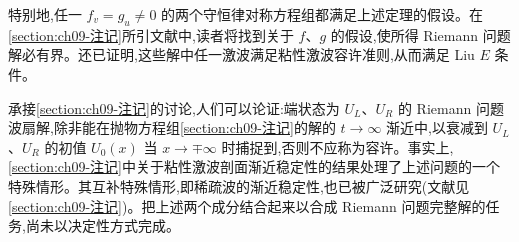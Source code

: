 \documentclass[../../main.tex]{subfiles}
\begin{document}
特别地,任一 $f_{v}=g_{u}\neq0$ 的两个守恒律对称方程组都满足上述定理的假设。在\cref{section:ch09-注记}所引文献中,读者将找到关于 $f$、$g$ 的假设,使所得 Riemann 问题解必有界。还已证明,这些解中任一激波满足粘性激波容许准则,从而满足 Liu $E$ 条件。

承接\cref{section:ch09-注记}的讨论,人们可以论证:端状态为 $U_{L}$、$U_{R}$ 的 Riemann 问题波扇解,除非能在抛物方程组\cref{section:ch09-注记}的解的 $t\to\infty$ 渐近中,以衰减到 $U_{L}$、$U_{R}$ 的初值 $U_{0}(x)$ 当 $x\to\mp\infty$ 时捕捉到,否则不应称为容许。事实上,\cref{section:ch09-注记}中关于粘性激波剖面渐近稳定性的结果处理了上述问题的一个特殊情形。其互补特殊情形,即稀疏波的渐近稳定性,也已被广泛研究(文献见\cref{section:ch09-注记})。把上述两个成分结合起来以合成 Riemann 问题完整解的任务,尚未以决定性方式完成。
\end{document}
